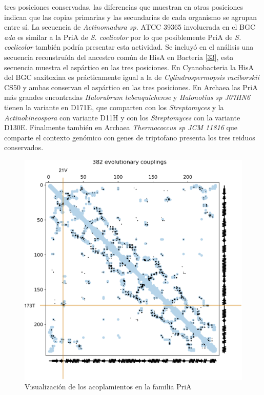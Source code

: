 \documentclass[12pt,twoside]{reedthesis}
\begin{document}
  tres posiciones conservadas, las diferencias que muestran en otras
  posiciones indican que las copias primarias y las secundarias de cada
  organismo se agrupan entre sí. La secuencia de \emph{Actinomadura sp.}
  ATCC 39365 involucrada en el BGC \emph{ada} es similar a la PriA de
  \emph{S. coelicolor} por lo que posiblemente PriA de \emph{S.
  coelicolor} también podría presentar esta actividad. Se incluyó en el
  análisis una secuencia reconstruída del ancestro común de HisA en
  Bacteria {[}\protect\hyperlink{ref-plach_long-term_2016}{33}{]}, esta
  secuencia muestra el aspártico en las tres posiciones. En Cyanobacteria
  la HisA del BGC saxitoxina es prácticamente igual a la de
  \emph{Cylindrospermopsis raciborskii} CS50 y ambas conservan el
  aspártico en las tres posiciones. En Archaea las PriA más grandes
  encontradas \emph{Halorubrum tebenquichense} y \emph{Halonotius sp
  J07HN6} tienen la variante en D171E, que comparten con los
  \emph{Streptomyces} y la \emph{Actinokineospora} con variante D11H y con
  los \emph{Streptomyces} con la variante D130E. Finalmente también en
  Archaea \emph{Thermococcus sp JCM 11816} que comparte el contexto
  genómico con genes de triptofano presenta los tres reiduos conservados.
  
  \begin{figure}[h!tbp]
  \centering
  \includegraphics[angle = 0,scale = .5]{chapter4/Couplings/HIS4_STRCO_1-200/align/couplings.pdf}
  \caption[Visualización de los acoplamientos en la familia PriA]{\footnotesize{Visualización de los acoplamientos en la familia PriA}}
  \label{fig:couplings}
  \end{figure}
  
\end{document}
